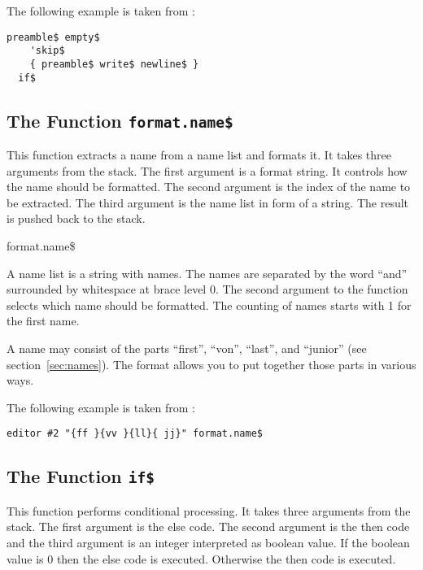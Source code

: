 The following example is taken from :

\begin{lstlisting}[language=bst]
  preamble$ empty$
    'skip$
    { preamble$ write$ newline$ }
  if$
\end{lstlisting}%


\subsection{The Function \texttt{format.name\$}}%

This function extracts a name from a name list and formats it. It
takes three arguments from the stack. The first argument is a format
string. It controls how the name should be formatted. The second
argument is the index of the name to be extracted. The third argument
is the name list in form of a string. The result is pushed back to the
stack.

\begin{BstFunction}{format.name\$}
\end{BstFunction}

A name list is a string with names. The names are separated by the
word ``and'' surrounded by whitespace at brace level 0. The second
argument to the function selects which name should be formatted. The
counting of names starts with 1 for the first name.

A name may consist of the parts ``first'', ``von'', ``last'', and
``junior'' (see section~\ref{sec:names}). The format allows you to put
together those parts in various ways.


\INCOMPLETE

The following example is taken from :

\begin{lstlisting}[language=bst]
  editor #2 "{ff }{vv }{ll}{ jj}" format.name$
\end{lstlisting}


\subsection{The Function \texttt{if\$}}%

This function performs conditional processing. It takes three
arguments from the stack. The first argument is the else code. The
second argument is the then code and the third argument is an integer
interpreted as boolean value. If the boolean value is 0 then the else
code is executed. Otherwise the then code is executed.

